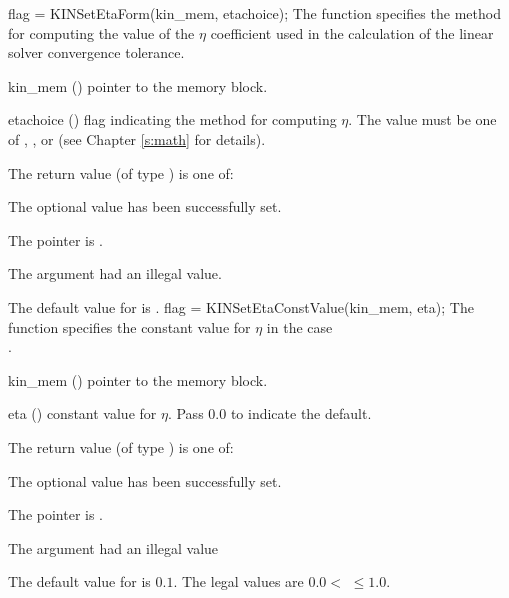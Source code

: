 {
flag = KINSetEtaForm(kin\_mem, etachoice);
}
{
  The function  specifies the method for computing
  the value of the $\eta$ coefficient used in the calculation of the
  linear solver convergence tolerance.
}
{
  \begin{args}[etachoice]
  \item[kin\_mem] ()
    pointer to the {\kinsol} memory block.
  \item[etachoice] ()
    flag indicating the method for computing $\eta$. The value must be one
    of , , or 
    (see Chapter \ref{s:math} for details).
  \end{args}
}
{
  The return value  (of type ) is one of:
  \begin{args}
  \item[\Id{KIN\_SUCCESS}] 
    The optional value has been successfully set.
  \item[\Id{KIN\_MEM\_NULL}]
    The  pointer is .
  \item[\Id{KIN\_ILL\_INPUT}]
    The argument  had an illegal value.
  \end{args}
}
{
  The default value for  is .
}
{
flag = KINSetEtaConstValue(kin\_mem, eta);
}
{
  The function  specifies the constant value
  for $\eta$ in the case \\ .
}
{
  \begin{args}
  \item[kin\_mem] ()
    pointer to the {\kinsol} memory block.
  \item[eta] ()
    constant value for $\eta$.  Pass $0.0$ to indicate the default.
  \end{args}
}
{
  The return value  (of type ) is one of:
  \begin{args}
  \item[\Id{KIN\_SUCCESS}] 
    The optional value has been successfully set.
  \item[\Id{KIN\_MEM\_NULL}]
    The  pointer is .
  \item[\Id{KIN\_ILL\_INPUT}]
    The argument  had an illegal value
  \end{args}
}
{
  The default value for  is $0.1$.
  The legal values are $0.0 <$  $\le 1.0$.
}
